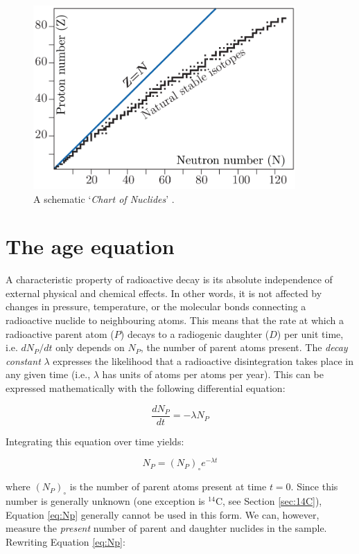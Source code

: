 \documentclass{book}
\newif\ifpdf
\begin{document}
\begin{figure}[!ht]
  \centering
  \ifpdf
  \def\svgwidth{.7\textwidth}
  
  \else
  \includegraphics[width=10cm]{chart-of-nuclides.png}
  \fi
  \caption{A schematic `\emph{Chart of Nuclides}' \citep[modified
      from][]{allegre2008}.}
  \label{fig:chart-of-nuclides}
\end{figure}

\section{The age equation}

A characteristic property of radioactive decay is its absolute
independence of external physical and chemical effects. In other
words, it is not affected by changes in pressure, temperature, or the
molecular bonds connecting a radioactive nuclide to neighbouring
atoms. This means that the rate at which a radioactive parent atom
($P$) decays to a radiogenic daughter ($D$) per unit time,
i.e. $dN_P/dt$ only depends on $N_P$, the number of parent atoms
present. The \emph{decay constant} $\lambda$ expresses the likelihood
that a radioactive disintegration takes place in any given time (i.e.,
$\lambda$ has units of atoms per atoms per year). This can be
expressed mathematically with the following differential equation:

\begin{equation}
\frac{dN_P}{dt} = -\lambda N_P
\label{eq:dNpdt}
\end{equation}

Integrating this equation over time yields:

\begin{equation}
N_P = (N_P)_\circ e^{-\lambda t}
\label{eq:Np}
\end{equation}

where $(N_P)_\circ$ is the number of parent atoms present at time
$t=0$.  Since this number is generally unknown (one exception is
$^{14}$C, see Section \ref{sec:14C}), Equation \ref{eq:Np} generally
cannot be used in this form. We can, however, measure the
\emph{present} number of parent and daughter nuclides in the
sample. Rewriting Equation \ref{eq:Np}:
\end{document}

